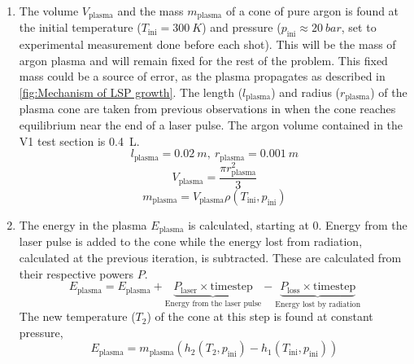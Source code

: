         \begin{enumerate}
            \item The volume $V_\mathrm{plasma}$ and the mass $m_\mathrm{plasma}$ of a cone of pure argon is found at the initial temperature ($T_\mathrm{ini} = \qty{300}{K}$) and pressure ($p_\mathrm{ini} \approx \qty{20}{bar}$, set to experimental measurement done before each shot). This will be the mass of argon plasma and will remain fixed for the rest of the problem. This fixed mass could be a source of error, as the plasma propagates as described in \autoref{fig:Mechanism of LSP growth}. The length ($l_\mathrm{plasma}$) and radius ($r_\mathrm{plasma}$) of the plasma cone are taken from previous observations in \textcite{duplayArgonLaserPlasmaThruster2024a} when the cone reaches equilibrium near the end of a laser pulse. The argon volume contained in the V1 test section is \qty{0.4}{L}.
                \begin{equation}
                    l_\mathrm{plasma} = \qty{0.02}{m}, \: r_\mathrm{plasma} = \qty{0.001}{m}
                \end{equation}
                \begin{equation}
                    V_\mathrm{plasma} = \frac{\pi r_\mathrm{plasma}^2}{3}
                \end{equation}
                \begin{equation}
                    m_\mathrm{plasma} = V_\mathrm{plasma}\rho(T_\mathrm{ini}, p_\mathrm{ini})
                \end{equation}
            \item The energy in the plasma $E_\mathrm{plasma}$ is calculated, starting at 0. Energy from the laser pulse is added to the cone while the energy lost from radiation, calculated at the previous iteration, is subtracted. These are calculated from their respective powers $P$.
                \begin{equation}
                    E_\mathrm{plasma} = E_\mathrm{plasma} + \underbrace{P_\mathrm{laser} \times \mathrm{timestep}}_\textrm{Energy from the laser pulse} - \underbrace{P_\mathrm{loss} \times \mathrm{timestep}}_\textrm{Energy lost by radiation}
                \end{equation}
                The new temperature ($T_2$) of the cone at this step is found at constant pressure,
                \begin{equation}
                    E_\mathrm{plasma} = m_\mathrm{plasma} \left(h_2 (T_2, p_\mathrm{ini}) - h_1(T_\mathrm{ini}, p_\mathrm{ini})\right)

\end{equation}
\end{enumerate}
